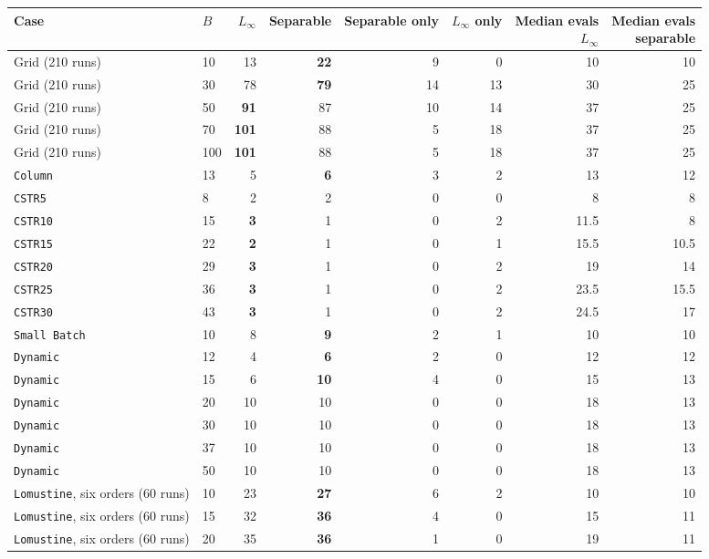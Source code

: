 \begin{tabular}{@{}llrrrrrr@{}}\toprule
Case & \(B\) & \(L_\infty\) & Separable & Separable only & \(L_\infty\) only & \makecell{Median evals\\\(L_\infty\)} & \makecell{Median evals\\separable} \\\midrule
Grid (210 runs) & 10 & 13 & \textbf{22} & 9 & 0 & 10 & 10 \\
Grid (210 runs) & 30 & 78 & \textbf{79} & 14 & 13 & 30 & 25 \\
Grid (210 runs) & 50 & \textbf{91} & 87 & 10 & 14 & 37 & 25 \\
Grid (210 runs) & 70 & \textbf{101} & 88 & 5 & 18 & 37 & 25 \\
Grid (210 runs) & 100 & \textbf{101} & 88 & 5 & 18 & 37 & 25 \\
\midrule
\texttt{Column} & 13 & 5 & \textbf{6} & 3 & 2 & 13 & 12 \\
\texttt{CSTR5} & 8 & 2 & 2 & 0 & 0 & 8 & 8 \\
\texttt{CSTR10} & 15 & \textbf{3} & 1 & 0 & 2 & 11.5 & 8 \\
\texttt{CSTR15} & 22 & \textbf{2} & 1 & 0 & 1 & 15.5 & 10.5 \\
\texttt{CSTR20} & 29 & \textbf{3} & 1 & 0 & 2 & 19 & 14 \\
\texttt{CSTR25} & 36 & \textbf{3} & 1 & 0 & 2 & 23.5 & 15.5 \\
\texttt{CSTR30} & 43 & \textbf{3} & 1 & 0 & 2 & 24.5 & 17 \\
\texttt{Small Batch} & 10 & 8 & \textbf{9} & 2 & 1 & 10 & 10 \\
\texttt{Dynamic} & 12 & 4 & \textbf{6} & 2 & 0 & 12 & 12 \\
\texttt{Dynamic} & 15 & 6 & \textbf{10} & 4 & 0 & 15 & 13 \\
\texttt{Dynamic} & 20 & 10 & 10 & 0 & 0 & 18 & 13 \\
\texttt{Dynamic} & 30 & 10 & 10 & 0 & 0 & 18 & 13 \\
\texttt{Dynamic} & 37 & 10 & 10 & 0 & 0 & 18 & 13 \\
\texttt{Dynamic} & 50 & 10 & 10 & 0 & 0 & 18 & 13 \\
\midrule
\texttt{Lomustine}, six orders (60 runs) & 10 & 23 & \textbf{27} & 6 & 2 & 10 & 10 \\
\texttt{Lomustine}, six orders (60 runs) & 15 & 32 & \textbf{36} & 4 & 0 & 15 & 11 \\
\texttt{Lomustine}, six orders (60 runs) & 20 & 35 & \textbf{36} & 1 & 0 & 19 & 11 \\
\bottomrule\end{tabular}
